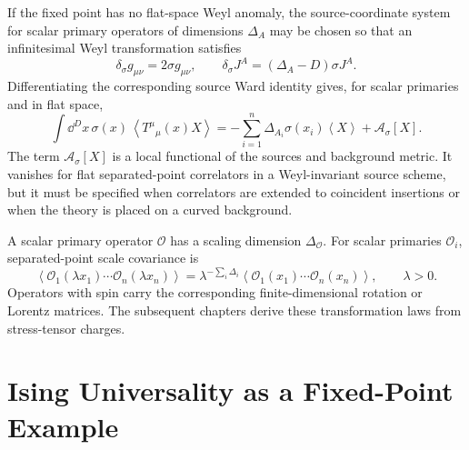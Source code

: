 If the fixed point has no flat-space Weyl anomaly, the source-coordinate system for scalar
primary operators of dimensions \(\Delta_A\) may be chosen so that an
infinitesimal Weyl transformation satisfies
\[
  \delta_\sigma g_{\mu\nu}=2\sigma g_{\mu\nu},
  \qquad
  \delta_\sigma J^A=(\Delta_A-D)\sigma J^A .
\]
Differentiating the corresponding source Ward identity gives, for scalar
primaries and in flat space,
\begin{equation}
  \int\dd^D x\,\sigma(x)\,
  \left\langle T^\mu{}_\mu(x)X\right\rangle
  =
  -\sum_{i=1}^n
  \Delta_{A_i}\sigma(x_i)
  \left\langle X\right\rangle
  +
  \mathcal A_\sigma[X].
  \label{eq:cft-smeared-weyl-ward}
\end{equation}
The term \(\mathcal A_\sigma[X]\) is a local functional of the sources and
background metric.  It vanishes for flat separated-point correlators in a
Weyl-invariant source scheme, but it must be specified when correlators are
extended to coincident insertions or when the theory is placed on a curved
background.

A scalar primary operator \(\mathcal O\) has a scaling dimension
\(\Delta_{\mathcal O}\).  For scalar primaries
\(\mathcal O_i\), separated-point scale covariance is
\begin{equation}
  \left\langle
  \mathcal O_1(\lambda x_1)\cdots\mathcal O_n(\lambda x_n)
  \right\rangle
  =
  \lambda^{-\sum_i\Delta_i}
  \left\langle
  \mathcal O_1(x_1)\cdots\mathcal O_n(x_n)
  \right\rangle,
  \qquad
  \lambda>0 .
  \label{eq:cft-opening-scale-covariance}
\end{equation}
Operators with spin carry the corresponding finite-dimensional rotation or
Lorentz matrices.  The subsequent chapters derive these transformation laws
from stress-tensor charges.

\section{Ising Universality as a Fixed-Point Example}

